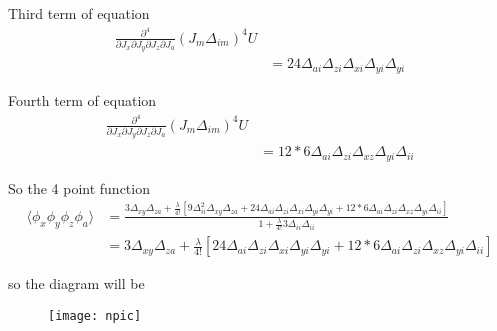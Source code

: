 \documentclass[12pt, letterpaper]{article}
\newcommand*{\1}{\hspace{1pt}}
\begin{document}
    Third term of equation 
    \begin{align*}
        \frac{\partial ^{4}}{\partial J_{x} \partial J_{y} \partial J_{z}\partial J_{a}}  (J_{m}\Delta_{im})^{4} U & \\
        & = 24\Delta_{ai}\Delta_{zi}\Delta_{xi}\Delta_{yi}\Delta_{yi}
    \end{align*}

    Fourth term of equation 
    \begin{align*}
        \frac{\partial ^{4}}{\partial J_{x} \partial J_{y} \partial J_{z}\partial J_{a}}  (J_{m}\Delta_{im})^{4} U & \\
        & = 12*6\Delta_{ai}\Delta_{zi}\Delta_{xz}\Delta_{yi}\Delta_{ii}
    \end{align*}

    So the 4 point function 
    \begin{align*}
        \langle \phi_{x}\phi_{y}\phi_{z}\phi_{a} \rangle &  = \frac{3 \Delta_{xy}\Delta_{za} + \frac{\lambda}{4!}[9\Delta_{ii}^{2}\Delta_{xy}\Delta_{za} + 24\Delta_{ai}\Delta_{zi}\Delta_{xi}\Delta_{yi}\Delta_{yi} + 12*6\Delta_{ai}\Delta_{zi}\Delta_{xz}\Delta_{yi}\Delta_{ii}]}{1 + \frac{\lambda}{4!}3\Delta_{ii}\Delta_{ii}} \\
        & = 3 \Delta_{xy}\Delta_{za} + \frac{\lambda}{4!}[24\Delta_{ai}\Delta_{zi}\Delta_{xi}\Delta_{yi}\Delta_{yi} + 12*6\Delta_{ai}\Delta_{zi}\Delta_{xz}\Delta_{yi}\Delta_{ii}]
    \end{align*}


    so the diagram will be
    \begin{figure}[h]
    \centering
    \texttt{[image: npic]}
    \end{figure}
\end{document}
